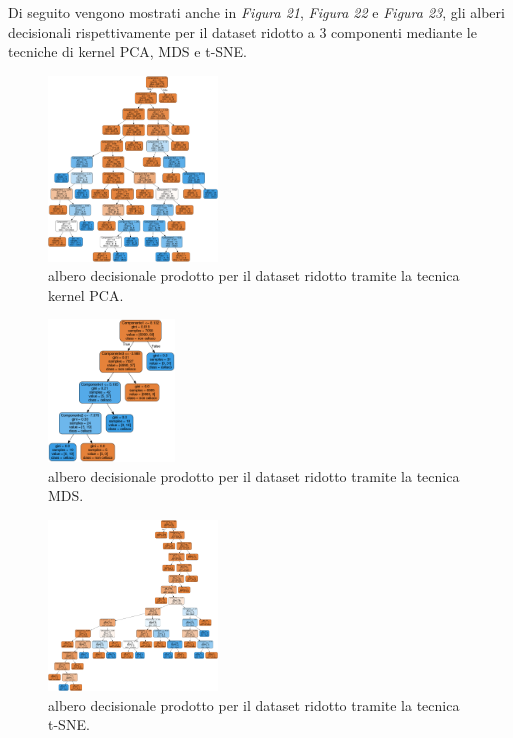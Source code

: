 \documentclass[11pt,a4paper,twocolumn]{article}
\begin{document}
Di seguito vengono mostrati anche in \emph{Figura 21}, \emph{Figura 22} e \emph{Figura 23}, gli alberi decisionali rispettivamente per il dataset ridotto a 3 componenti mediante le tecniche di kernel PCA, MDS e t-SNE.
\begin{figure}[H]
	\centering
	\includegraphics[width=0.4\textwidth]{img/decision_tree_kernelPCA.png}
	\caption{albero decisionale prodotto per il dataset ridotto tramite la tecnica kernel PCA.}
\end{figure}
\begin{figure}[H]
	\centering
	\includegraphics[width=0.3\textwidth]{img/decision_tree_MDS.png}
	\caption{albero decisionale prodotto per il dataset ridotto tramite la tecnica MDS.}
\end{figure}
\begin{figure}[H]
	\centering
	\includegraphics[width=0.4\textwidth]{img/decision_tree_tSNE.png}
	\caption{albero decisionale prodotto per il dataset ridotto tramite la tecnica t-SNE.}
\end{figure}
\end{document}
